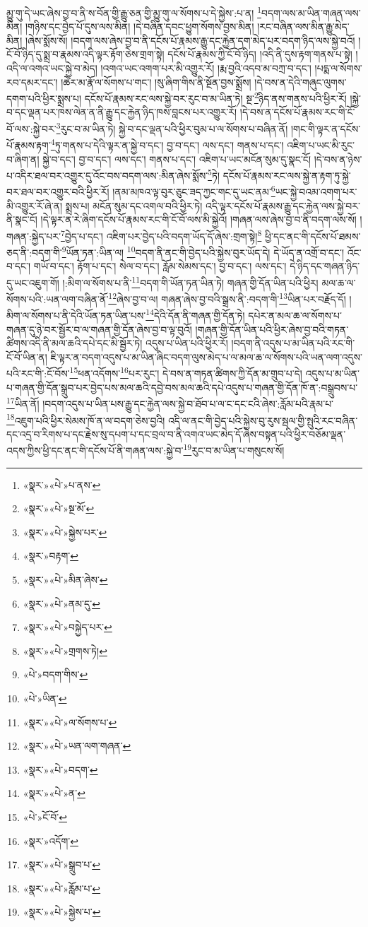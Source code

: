 མྱུ་གུ་དེ་ཡང་ཞེས་བྱ་བ་ནི་ས་བོན་གྱི་རྒྱུ་ཅན་གྱི་མྱུ་གུ་ལ་སོགས་པ་དེ་སྐྱེས་:པ་ན། \footnote{«སྣར་»«པེ་»པ་ནས་}བདག་ལས་མ་ཡིན་གཞན་ལས་མིན། །གཉིས་དང་བྱེད་པོ་དུས་ལས་མིན། །དེ་བཞིན་དབང་ཕྱུག་སོགས་བྱས་མིན། །རང་བཞིན་ལས་མིན་རྒྱུ་མེད་མིན། །ཞེས་སྨོས་སོ། །བདག་ལས་ཞེས་བྱ་བ་ནི་དངོས་པོ་རྣམས་རྒྱུ་དང་རྐྱེན་དག་མེད་པར་བདག་ཉིད་ལས་སྐྱེ་བའོ། །ངོ་བོ་ཉིད་དུ་སྨྲ་བ་རྣམས་འདི་ལྟར་རྟོག་ཅེས་གྲག་སྟེ། དངོས་པོ་རྣམས་ཀྱི་ངོ་བོ་ཉིད། །འདི་ནི་དུས་རྟག་གནས་པ་སྟེ། །འདི་ལ་འགའ་ཡང་སྐྱེ་བ་མེད། །འགའ་ཡང་འགག་པར་མི་འགྱུར་རོ། །རྨ་བྱའི་འདབ་མ་བཀྲ་བ་དང་། །པདྨ་ལ་སོགས་རབ་དམར་དང་། །ཚེར་མ་རྣོ་ལ་སོགས་པ་གང་། །སུ་ཞིག་གིས་ནི་སྔོན་བྱས་སྨྲོས། །དེ་བས་ན་དེའི་གཞུང་ལུགས་དགག་པའི་ཕྱིར་སྨྲས་པ། དངོས་པོ་རྣམས་རང་ལས་སྐྱེ་བར་རུང་བ་མ་ཡིན་ཏེ། སྔ་\footnote{«སྣར་»«པེ་»སྔ་མོ་}ཉིད་ནས་གནས་པའི་ཕྱིར་རོ། །སྐྱེ་བ་དང་ལྡན་པར་ཁས་ལེན་ན་ནི་རྒྱུ་དང་རྐྱེན་ཉིད་ཁས་བླངས་པར་འགྱུར་རོ། །དེ་བས་ན་དངོས་པོ་རྣམས་རང་གི་ངོ་བོ་ལས་:སྐྱེ་བར་\footnote{«སྣར་»«པེ་»སྐྱེས་པར་}རུང་བ་མ་ཡིན་ཏེ། སྐྱེ་བ་དང་ལྡན་པའི་ཕྱིར་བུམ་པ་ལ་སོགས་པ་བཞིན་ནོ། །གང་གི་ལྟར་ན་དངོས་པོ་རྣམས་རྟག་\footnote{«སྣར་»བརྟག་}ཏུ་གནས་པ་དེའི་ལྟར་ན་སྐྱེ་བ་དང་། བྱ་བ་དང་། ལས་དང་། གནས་པ་དང་། འཇིག་པ་ཡང་མི་རུང་བ་ཞིག་ན། སྐྱེ་བ་དང་། བྱ་བ་དང་། ལས་དང་། གནས་པ་དང་། འཇིག་པ་ཡང་མངོན་སུམ་དུ་སྣང་ངོ། །དེ་བས་ན་ཉེས་པ་འདིར་ཐལ་བར་འགྱུར་དུ་འོང་བས་བདག་ལས་:མིན་ཞེས་སྨོས་\footnote{«སྣར་»«པེ་»མིན་ཞེས་}ཏེ། དངོས་པོ་རྣམས་རང་ལས་སྐྱེ་ན་རྟག་ཏུ་སྐྱེ་བར་ཐལ་བར་འགྱུར་བའི་ཕྱིར་རོ། །ནམ་མཁའ་ལྟ་བུར་ཅུང་ཟད་ཀྱང་གང་དུ་ཡང་ནམ་\footnote{«སྣར་»«པེ་»ནམ་དུ་}ཡང་སྐྱེ་བའམ་འགག་པར་མི་འགྱུར་རོ་ཞེ་ན། སྨྲས་པ། མངོན་སུམ་དང་འགལ་བའི་ཕྱིར་ཏེ། འདི་ལྟར་དངོས་པོ་རྣམས་རྒྱུ་དང་རྐྱེན་ལས་སྐྱེ་བར་ནི་སྣང་ངོ། །དེ་ལྟར་ན་རེ་ཞིག་དངོས་པོ་རྣམས་རང་གི་ངོ་བོ་ལས་མི་སྐྱེའོ། །གཞན་ལས་ཞེས་བྱ་བ་ནི་བདག་ལས་སོ། །གཞན་:སྐྱེད་པར་\footnote{«སྣར་»«པེ་»བསྐྱེད་པར་}བྱེད་པ་དང་། འཇིག་པར་བྱེད་པའི་བདག་ཡོད་དོ་ཞེས་:གྲག་སྟེ།\footnote{«སྣར་»«པེ་»གྲགས་ཏེ།} ཕྱི་དང་ནང་གི་དངོས་པོ་ཐམས་ཅད་ནི་:བདག་གི་\footnote{«པེ་»བདག་གིས་}ཡོན་ཏན་:ཡིན་ལ། \footnote{«པེ་»ཡིན་}བདག་ནི་ནང་གི་བྱེད་པའི་སྐྱེས་བུར་ཡོད་དེ། དེ་ཡོད་ན་འགྲོ་བ་དང་། འོང་བ་དང་། གཡོ་བ་དང་། རྟོག་པ་དང་། སེལ་བ་དང་། རློམ་སེམས་དང་། བྱ་བ་དང་། ལས་དང་། དེ་ཉིད་དང་གཞན་ཉིད་དུ་ཡང་འཇུག་གོ། །:མིག་ལ་སོགས་པ་ནི་\footnote{«སྣར་»«པེ་»ལ་སོགས་པ་}བདག་གི་ཡོན་ཏན་ཡིན་ཏེ། གཞན་གྱི་དོན་ཡིན་པའི་ཕྱིར། མལ་ཆ་ལ་སོགས་པའི་:ཡན་ལག་བཞིན་ནོ་\footnote{«སྣར་»«པེ་»ཡན་ལག་གཞན་}ཞེས་བྱ་བ་ལ། གཞན་ཞེས་བྱ་བའི་སྒྲས་ནི་:བདག་གི་\footnote{«སྣར་»«པེ་»བདག་}ཡིན་པར་བརྗོད་དོ། །མིག་ལ་སོགས་པ་ནི་དེའི་ཡོན་ཏན་ཡིན་པས་\footnote{«སྣར་»«པེ་»ན་}དེའི་དོན་ནི་གཞན་གྱི་དོན་ཏེ། དཔེར་ན་མལ་ཆ་ལ་སོགས་པ་གཞན་དུ་ཉེ་བར་སྦྱོར་བ་ལ་གཞན་གྱི་དོན་ཞེས་བྱ་བ་ལྟ་བུའོ། །གཞན་གྱི་དོན་ཡིན་པའི་ཕྱིར་ཞེས་བྱ་བའི་གཏན་ཚིགས་འདི་ནི་མལ་ཆའི་དཔེ་དང་མི་སྦྱོར་ཏེ། འདུས་པ་ཡིན་པའི་ཕྱིར་རོ། །བདག་ནི་འདུས་པ་མ་ཡིན་པའི་རང་གི་ངོ་བོ་ཡིན་ན། ཇི་ལྟར་ན་བདག་འདུས་པ་མ་ཡིན་ཞིང་བདག་ལུས་མེད་པ་ལ་མལ་ཆ་ལ་སོགས་པའི་ཡན་ལག་འདུས་པའི་རང་གི་:ངོ་བོས་\footnote{«པེ་»ངོ་བོ་}ཕན་འདོགས་\footnote{«སྣར་»འདོག་}པར་རུང་། དེ་བས་ན་གཏན་ཚིགས་ཀྱི་དོན་མ་གྲུབ་པ་དེ། འདུས་པ་མ་ཡིན་པ་གཞན་གྱི་དོན་སྒྲུབ་པར་བྱེད་པས་མལ་ཆའི་དབྱེ་བས་མལ་ཆའི་དཔེ་འདུས་པ་གཞན་གྱི་དོན་ཁོ་ན་:བསྒྲུབས་པ་\footnote{«སྣར་»«པེ་»སྒྲུབ་པ་}ཡིན་ནོ། །བདག་འདུས་པ་ཡིན་པས་རྒྱུ་དང་རྐྱེན་ལས་སྐྱེ་བ་ཐོབ་པ་ལ་ང་དང་ངའི་ཞེས་:རློམ་པའི་རྣམ་པ་\footnote{«སྣར་»«པེ་»རློམ་པ་}འཇུག་པའི་ཕྱིར་སེམས་ཁོ་ན་ལ་བདག་ཅེས་བྱའི། འདི་ལ་ནང་གི་བྱེད་པའི་སྐྱེས་བུ་རུས་སྦལ་གྱི་སྤུའི་རང་བཞིན་དང་འདྲ་བ་རིགས་པ་དང་རྗེས་སུ་དཔག་པ་དང་བྲལ་བ་ནི་འགའ་ཡང་མེད་དོ་ཞེས་བསྟན་པའི་ཕྱིར་བཅོམ་ལྡན་འདས་ཀྱིས་ཕྱི་དང་ནང་གི་དངོས་པོ་ནི་གཞན་ལས་:སྐྱེ་བ་\footnote{«སྣར་»«པེ་»སྐྱེས་པ་}རུང་བ་མ་ཡིན་པ་གསུངས་སོ། 